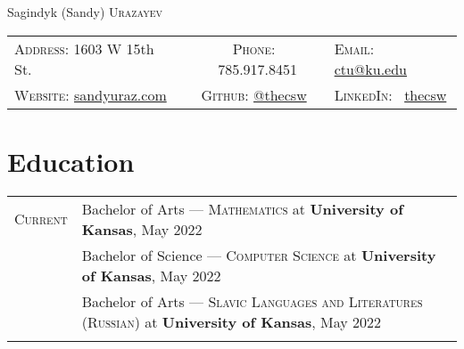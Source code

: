 \documentclass[a4paper, 10pt]{article}
\begin{document}
\pagestyle{empty}
\enlargethispage{\baselineskip}

\par{\centering
	{\Huge Sagindyk (Sandy) \textsc{Urazayev}
	}\smallskip\par}

\begin{center}
	\begin{tabular}{lcl}
		\textsc{Address:}   1603 W 15th St.                              &
		\textsc{Phone:} \quad \ 785.917.8451                             &
		\textsc{Email:} \quad \href{mailto:ctu@ku.edu}{ctu@ku.edu}         \\

		\textsc{Website:} \href{https://sandyuraz.com}{sandyuraz.com}    &
		\textsc{Github:} \quad \href{https://github.com/thecsw}{@thecsw} &
		\textsc{LinkedIn:} \ \href{https://linkedin.com/in/thecsw}{thecsw} \\
	\end{tabular}
\end{center}

\section{Education}
\begin{tabular}{rl}
	\textsc{Current} & Bachelor of Arts --- \textsc{Mathematics} at \normalsize\textbf{University of Kansas}, May 2022                                \\
	                 & Bachelor of Science --- \textsc{Computer Science} at \normalsize\textbf{University of Kansas}, May 2022                        \\
	                 & Bachelor of Arts --- \textsc{Slavic Languages and Literatures (Russian)} at \normalsize\textbf{University of Kansas}, May 2022 \\

	\\
\end{tabular}
\end{document}
